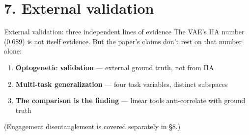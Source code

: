 \documentclass[aspectratio=169,11pt]{beamer}
\begin{document}
\section{7. External validation}

\begin{frame}{External validation: three independent lines of evidence}
\vspace{0.3em}
The VAE's IIA number (0.689) is not itself evidence. But the paper's claims don't rest on that number alone:

\vspace{0.5em}
\begin{enumerate}\setlength\itemsep{0.6em}
  \item \textbf{Optogenetic validation} --- external ground truth, not from IIA
  \item \textbf{Multi-task generalization} --- four task variables, distinct subspaces
  \item \textbf{The comparison is the finding} --- linear tools anti-correlate with ground truth
\end{enumerate}

\vspace{0.5em}
{\small (Engagement disentanglement is covered separately in \S8.)}
\end{frame}
\end{document}
